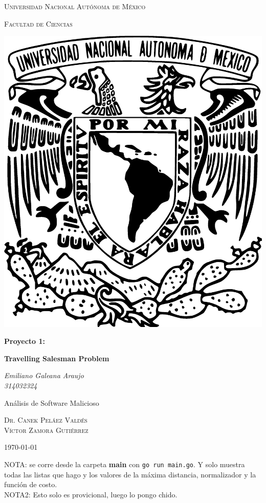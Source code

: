 \documentclass[12pt,a4paper]{article}
\begin{document}
\begin{titlepage}
  \centering
      {\scshape\LARGE Universidad Nacional Autónoma de México \par}
      \vspace{1cm}
	     {\scshape\Large Facultad de Ciencias\par}
	     \vspace{1.2cm}
             \begin{center}
	       \includegraphics[scale=.2]{./imagenes/UNAM.eps}
	     \end{center}
	     \vspace{.5 cm}

	     {\huge\bfseries Proyecto 1: \par}
	     {\huge\bfseries Travelling Salesman Problem\par}
	     \vspace{0.5cm}

	     {\Large\itshape Emiliano Galeana Araujo\\314032324\par}
	     \vfill
	     \vspace{0.5cm}

             Análisis de Software Malicioso\par
	     \textsc{Dr. Canek Peláez Valdés}\\
             \textsc{Víctor Zamora Gutiérrez}\\
	     \vspace{0.1cm}
	            {\large \today \par}
\end{titlepage}

NOTA: se corre desde la carpeta \textbf{main} con \texttt{go run main.go}. Y solo
muestra todas las listas que hago y los valores de la máxima distancia,
normalizador y la función de costo.\\
NOTA2: Esto solo es provicional, luego lo pongo chido.
\end{document}

